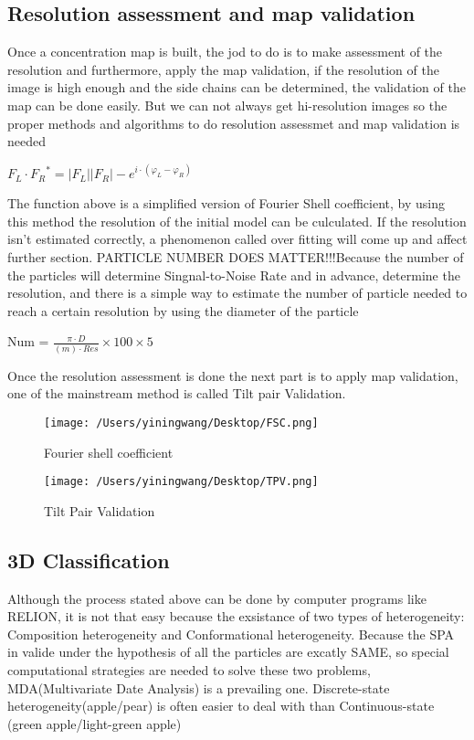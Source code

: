 \documentclass{article}
\begin{document}
    \subsection{Resolution assessment and map validation}
    Once a concentration map is built, the jod to do is to make assessment of the resolution and 
    furthermore, apply the map validation, if the resolution of the image is high enough and the side chains
    can be determined, the validation of the map can be done easily. But we can not always get hi-resolution images
    so the proper methods and algorithms to do resolution assessmet and map validation is needed
    \begin{center}
        \begin{framed}
            $F_L \cdot {F_R}^* = \left\lvert F_L\right\rvert \left\lvert F_R\right\rvert - e^{i \cdot (\varphi_L - \varphi_R)}$
        \end{framed}
    \end{center}  
    The function above is a simplified version of Fourier Shell coefficient, by using this method the resolution of the 
    initial model can be culculated. If the resolution isn't estimated correctly, a phenomenon called over fitting
    will come up and affect further section. 
    PARTICLE NUMBER DOES MATTER!!!Because the number of the particles will determine Singnal-to-Noise Rate and in advance, determine the 
    resolution, and there is a simple way to estimate the number of particle needed to reach a
    certain resolution by using the diameter of the particle 
    \begin{center}
        \begin{framed}
            Num = $\frac{\pi \cdot D}{(m) \cdot Res} \times 100\times 5$
        \end{framed}
    \end{center} 
    Once the resolution assessment is done the next part is to apply map validation, one of the mainstream 
    method is called Tilt pair Validation. 
    \begin{figure}[p]
        \centering
        \texttt{[image: /Users/yiningwang/Desktop/FSC.png]} 
        \caption{\small Fourier shell coefficient}
    \end{figure}
    \begin{figure}[p]
        \centering
        \texttt{[image: /Users/yiningwang/Desktop/TPV.png]} 
        \caption{\small Tilt Pair Validation}
    \end{figure}
    \subsection{3D Classification}
    Although the process stated above can be done by computer programs like RELION, it is not that easy because the 
    exsistance of two types of heterogeneity: Composition heterogeneity and Conformational heterogeneity.
    Because the SPA in valide under the hypothesis of all the particles are excatly SAME, so special computational 
    strategies are needed to solve these two problems, MDA(Multivariate Date Analysis) is a prevailing one.
    Discrete-state heterogeneity(apple/pear) is often easier to deal with than Continuous-state (green apple/light-green apple)
\end{document}
